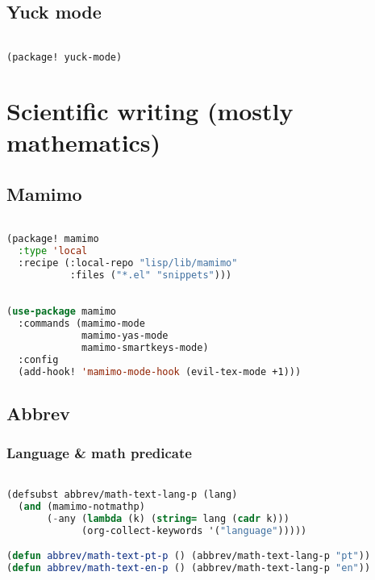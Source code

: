 \documentclass[11pt]{article}
\begin{document}
\subsection{Yuck mode}
\label{sec:yuck-mode}
\begin{lstlisting}[language=Lisp]%! Someone please complete this list for me

(package! yuck-mode)
\end{lstlisting}


\section{Scientific writing (mostly mathematics)}
\label{sec:scientific-writing-mostly-mathematics}


\subsection{Mamimo}
\label{sec:mamimo}
\begin{lstlisting}[language=Lisp]%! Someone please complete this list for me

(package! mamimo
  :type 'local
  :recipe (:local-repo "lisp/lib/mamimo"
           :files ("*.el" "snippets")))
\end{lstlisting}

\begin{lstlisting}[language=Lisp]%! Someone please complete this list for me

(use-package mamimo
  :commands (mamimo-mode
             mamimo-yas-mode
             mamimo-smartkeys-mode)
  :config
  (add-hook! 'mamimo-mode-hook (evil-tex-mode +1)))
\end{lstlisting}

\subsection{Abbrev}
\label{sec:abbrev-1}


\subsubsection{Language \& math predicate}
\label{sec:language-math-predicate}
\begin{lstlisting}[language=Lisp]%! Someone please complete this list for me

(defsubst abbrev/math-text-lang-p (lang)
  (and (mamimo-notmathp)
       (-any (lambda (k) (string= lang (cadr k)))
             (org-collect-keywords '("language")))))

(defun abbrev/math-text-pt-p () (abbrev/math-text-lang-p "pt"))
(defun abbrev/math-text-en-p () (abbrev/math-text-lang-p "en"))
\end{lstlisting}
\end{document}
